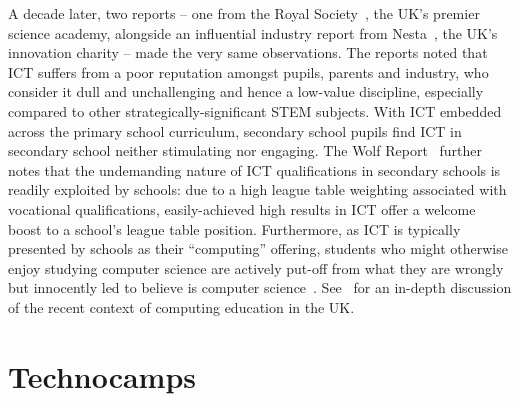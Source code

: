\documentclass{sig-alternate}
\begin{document}
A decade later, two reports -- one from the Royal
Society~\cite{RoyalSoc:2012}, the UK's premier science academy,
alongside an influential industry report from
Nesta~\cite{nextgen-report}, the UK's innovation charity -- made the
very same observations.  The reports noted that ICT suffers from a
poor reputation amongst pupils, parents and industry, who consider it
dull and unchallenging and hence a low-value discipline, especially
compared to other strategically-significant STEM subjects.  With ICT
embedded across the primary school curriculum, secondary school pupils
find ICT in secondary school neither stimulating nor engaging. The
Wolf Report~\cite{Wolf:2011} further notes that the undemanding nature
of ICT qualifications in secondary schools is readily exploited by
schools: due to a high league table weighting associated with
vocational qualifications, easily-achieved high results in ICT offer a
welcome boost to a school's league table position. Furthermore, as ICT
is typically presented by schools as their ``computing'' offering,
students who might otherwise enjoy studying computer science are
actively put-off from what they are wrongly but innocently led to
believe is computer
science~\cite{crick+sentance:2011}. See~\cite{brown-et-al-sigcse2012,brown-et-al-toce2014}
for an in-depth discussion of the recent context of computing
education in the UK.

\section{Technocamps}\label{technocamps}

\end{document}
